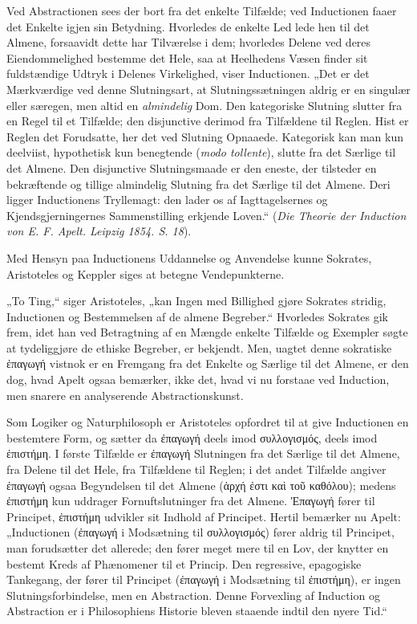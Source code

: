 \documentclass[12pt]{book}
\newcommand{\opage}[1]{\marginnote{\footnotesize\textit{[#1]}}}
\begin{document}
Ved Abstractionen sees der bort fra det enkelte Tilfælde; ved Inductionen faaer det
Enkelte igjen sin Betydning. Hvorledes de enkelte Led lede hen til det Almene,
forsaavidt dette har Tilværelse i dem; hvorledes Delene ved deres Eiendommelighed
bestemme det Hele, saa at Heelhedens Væsen finder sit fuldstændige Udtryk i Delenes
Virkelighed, viser Inductionen. „Det er det Mærkværdige ved denne Slutningsart, at
Slutningssætningen aldrig er en singulær eller særegen, men altid en \emph{almindelig}
Dom. Den kategoriske Slutning slutter fra en Regel til et Tilfælde; den disjunctive
derimod fra Tilfældene til Reglen. Hist er Reglen det Forudsatte, her det ved Slutning
Opnaaede. Kategorisk kan man kun deelviist, hypothetisk kun benegtende (\textit{modo
tollente}), slutte fra det Særlige til det Almene. Den disjunctive Slutningsmaade er
den eneste, der tilsteder en bekræftende og tillige almindelig Slutning fra det
Særlige til det Almene. Deri ligger Inductionens Tryllemagt: den lader os af
Iagttagelsernes og Kjendsgjerningernes Sammenstilling erkjende Loven.“ (\textit{Die
Theorie der Induction von E. F. Apelt. Leipzig 1854. S. 18}).

Med Hensyn paa Inductionens Uddannelse og Anvendelse kunne Sokrates, Aristoteles og
Keppler siges at betegne Vendepunkterne.

„To Ting,“ siger Aristoteles, „kan Ingen med Billighed gjøre Sokrates stridig,
Inductionen og Bestemmelsen af de almene Begreber.“ Hvorledes Sokrates gik frem, idet
han ved Betragtning af en Mængde enkelte Tilfælde og
\opage{57} Exempler søgte at tydeliggjøre de ethiske Begreber, er bekjendt. Men, uagtet denne
sokratiske ἐπαγωγή vistnok er en Fremgang fra det Enkelte og Særlige til det Almene,
er den dog, hvad Apelt ogsaa bemærker, ikke det, hvad vi nu forstaae ved Induction,
men snarere en analyserende Abstractionskunst.

Som Logiker og Naturphilosoph er Aristoteles opfordret til at give Inductionen en
bestemtere Form, og sætter da ἐπαγωγή deels imod συλλογισμός, deels imod ἐπιστήμη. I
første Tilfælde er ἐπαγωγή Slutningen fra det Særlige til det Almene, fra Delene til
det Hele, fra Tilfældene til Reglen; i det andet Tilfælde angiver ἐπαγωγή ogsaa
Begyndelsen til det Almene (ἀρχή ἐστι καὶ τοῦ καθόλου); medens ἐπιστήμη kun uddrager
Fornuftslutninger fra det Almene. Ἐπαγωγή fører til Principet, ἐπιστήμη udvikler sit
Indhold af Principet. Hertil bemærker nu Apelt: „Inductionen (ἐπαγωγή i Modsætning til
συλλογισμός) fører aldrig til Principet, man forudsætter det allerede; den fører meget
mere til en Lov, der knytter en bestemt Kreds af Phænomener til et Princip. Den
regressive, epagogiske Tankegang, der fører til Principet (ἐπαγωγή i Modsætning til
ἐπιστήμη), er ingen Slutningsforbindelse, men en Abstraction. Denne Forvexling af
Induction og Abstraction er i Philosophiens Historie bleven staaende indtil den nyere
Tid.“
\end{document}
